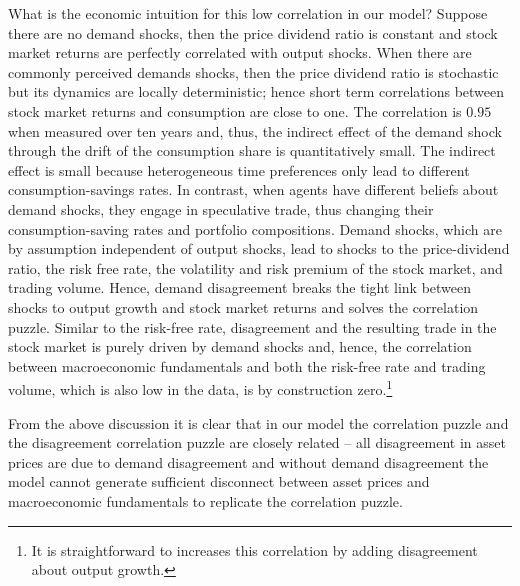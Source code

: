 What is the economic intuition for this low correlation in our model? Suppose there are no demand shocks, then the price dividend ratio is constant and stock market returns are perfectly correlated with output shocks. When there are commonly perceived demands shocks, then the price dividend ratio is stochastic but its dynamics are locally deterministic; hence short term correlations between stock market returns and consumption are close to one. The correlation is $0.95$ when measured over ten years and, thus, the indirect effect of the demand shock through the drift of the consumption share is quantitatively small.  The indirect effect is small because heterogeneous time preferences only lead to different consumption-savings rates.   In contrast, when agents have different beliefs about demand shocks, they engage in speculative trade, thus changing their consumption-saving rates and portfolio compositions. Demand shocks, which are by assumption independent of output shocks, lead to shocks to the price-dividend ratio, the risk free rate, the volatility and risk premium of the stock market, and trading volume. Hence, demand disagreement breaks the tight link between shocks to output growth and stock market returns and solves the correlation puzzle.   Similar to the risk-free rate, disagreement and the resulting trade in the stock market is purely driven by demand shocks and, hence, the correlation between macroeconomic fundamentals and both the risk-free rate and trading volume, which is also low in the data, is by construction zero.\footnote{It is straightforward to increases this correlation by adding disagreement about output growth.} 

From the above discussion it is clear that in our model the correlation puzzle and the disagreement correlation puzzle are closely related -- all disagreement in asset prices are due to demand disagreement  and without demand disagreement the model cannot generate sufficient disconnect between asset prices and macroeconomic fundamentals to replicate the correlation puzzle. 
